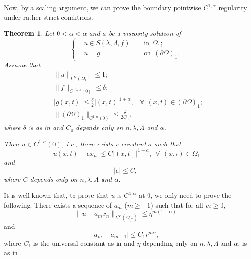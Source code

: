 \documentclass[preprint,12pt]{elsarticle}
\newtheorem{theorem}{Theorem}[section]
\theoremstyle{definition}
\theoremstyle{remark}
\numberwithin{equation}{section}
\begin{document}
Now, by a scaling argument, we can prove the boundary pointwise $C^{1,\alpha}$ regularity under rather strict conditions.
\begin{theorem}\label{L.Sca1}
Let $0<\alpha<\bar{\alpha}$ and $u$ be a viscosity solution of
\begin{equation*}
\left\{\begin{aligned}
&u\in S(\lambda,\Lambda,f)&& ~~\mbox{in}~~\Omega_1;\\
&u=g&& ~~\mbox{on}~~(\partial \Omega)_1.
\end{aligned}\right.
\end{equation*}
Assume that
\begin{equation}\label{e.Sca.C1a1}
  \begin{aligned}
    &\|u\|_{L^{\infty}(\Omega_1)}\leq 1;\\
    &\|f\|_{C^{-1,\alpha}(0)}\leq \delta;\\
    &|g(x,t)|\leq \frac{\delta}{2} |(x,t)|^{1+\alpha},~~~~\forall~~(x,t)\in (\partial\Omega)_1;\\
    &\|(\partial \Omega)_1\|_{C^{1,\alpha}(0)}\leq \frac{\delta}{2C_0},
  \end{aligned}
\end{equation}
where $\delta$ is as in  and $C_0$ depends only on $n,\lambda,\Lambda$ and $\alpha$.

Then $u\in C^{1,\alpha}(0)$, i.e., there exists a constant $a$ such that
\begin{equation*}\label{e.Sca1.1}
  |u(x,t)-ax_n|\leq C|(x,t)|^{1+\alpha},~~\forall~~(x,t)\in \Omega_1
\end{equation*}
and
\begin{equation*}\label{e.Sca1.2}
|a|\leq C,
\end{equation*}
where $C$ depends only on $n,\lambda,\Lambda$ and $\alpha$.
\end{theorem}

\proof It is well-known that, to prove that $u$ is $C^{1,\alpha}$ at $0$, we only need to prove the following. There exists a sequence of $a_m$ ($m\geq -1$) such that for all $m\geq 0$,
\begin{equation}\label{e.ScaC1a.1}
\|u-a_mx_n\|_{L^{\infty }(\Omega_{\eta^{m}})}\leq \eta ^{m(1+\alpha )}
\end{equation}
and
\begin{equation}\label{e.ScaC1a.2}
|a_m-a_{m-1}|\leq C_1\eta ^{m\alpha},
\end{equation}
where $C_1$ is the universal constant as in  and $\eta$ depending only on $n,\lambda,\Lambda$ and $\alpha$, is as in .
\end{document}
